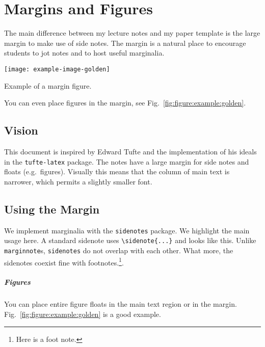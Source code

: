 
\chapter{Margins and Figures} %

The main difference between my lecture notes and my paper template is the large margin to make use of side notes. The margin is a natural place to encourage students to jot notes and to host useful marginalia.%
\begin{marginfigure}%
    \texttt{[image: example-image-golden]}
    \caption{Example of a margin figure.}
    \label{fig:figure:example:golden}
\end{marginfigure}
You can even place figures in the margin, see Fig.~\ref{fig:figure:example:golden}.

\section{Vision}

This document is inspired by Edward Tufte and the implementation of his ideals in the \texttt{tufte-latex} package. The notes have a large margin for side notes and floats (e.g.\ figures).  Visually this means that the column of main text is narrower, which permits a slightly smaller font.


\section{Using the Margin}

We implement marginalia with the \texttt{sidenotes} package. We highlight the main usage here. A standard sidenote uses \verb!\sidenote{...}! and looks like this. Unlike \verb!marginnote!s, \verb!sidenotes! do not overlap with each other. What more, the sidenotes coexist fine with footnotes.\footnote{Here is a foot note.}.

\paragraph{Figures} You can place entire figure floats in the main text region or in the margin. Fig.~\ref{fig:figure:example:golden} is a good example.

